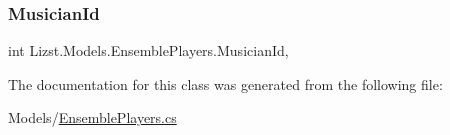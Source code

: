 \subsubsection{\texorpdfstring{MusicianId}{MusicianId}}
{\footnotesize\ttfamily int Lizst.\+Models.\+Ensemble\+Players.\+Musician\+Id\hspace{0.3cm}{\ttfamily [get]}, {\ttfamily [set]}}



The documentation for this class was generated from the following file\+:\begin{DoxyCompactItemize}
\item 
Models/\mbox{\hyperlink{_ensemble_players_8cs}{Ensemble\+Players.\+cs}}\end{DoxyCompactItemize}
